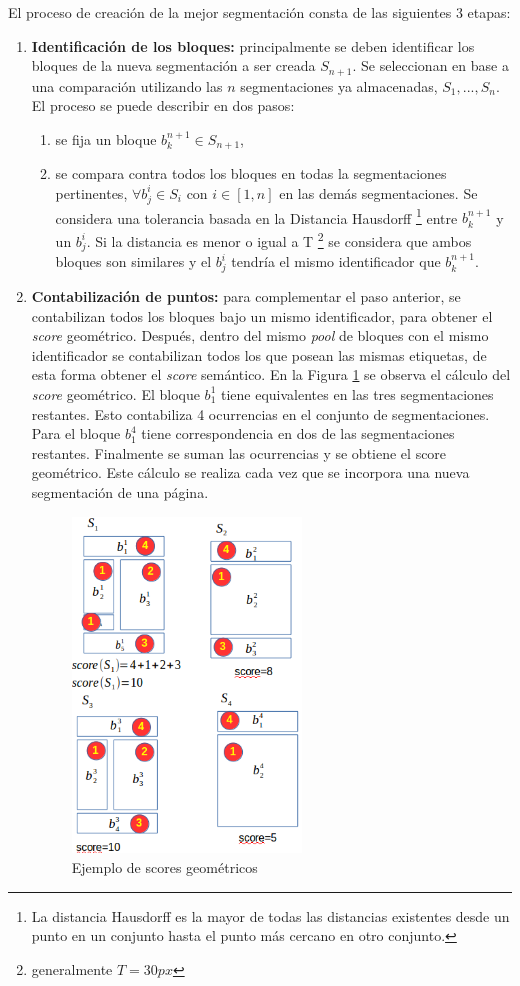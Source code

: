 \documentclass[10pt]{revecom}
\begin{document}
El proceso de creación de la mejor segmentación consta de las siguientes 3 etapas: 
\begin{enumerate}
\item \textbf{Identificación de los bloques:} principalmente se deben identificar los bloques de la nueva segmentación a ser creada $S_{n+1}$. Se seleccionan en base a una comparación utilizando las $n$ segmentaciones ya almacenadas, $S_{1},...,S_{n} $. 
El proceso se puede describir en dos pasos: 
\begin{enumerate}
\item se fija un bloque $b_{k}^{n+1} \in S_{n+1}$, 
\item se compara contra todos los bloques en todas la segmentaciones pertinentes, $\forall b_{j}^{i} \in S_i$ con $i \in [1,n]$ en las demás segmentaciones. 
Se considera una tolerancia basada en la Distancia Hausdorff \footnote{La distancia Hausdorff es la mayor de todas las distancias existentes desde un punto en un conjunto hasta el punto más cercano en otro conjunto.} entre $b_{k}^{n+1}$ y un $b_{j}^{i} $. 
Si la distancia es menor o igual a T \footnote{generalmente $T=30px$} se considera que ambos bloques son similares y el $b_{j}^{i}$  tendría el mismo identificador que $b_{k}^{n+1}$.  
 \end{enumerate}
\item \textbf{Contabilización de puntos:} para complementar el paso anterior, se contabilizan todos los bloques bajo un mismo identificador, para obtener el \textit{score} geométrico. Después, dentro del mismo \textit{pool} de bloques con el mismo identificador se contabilizan todos los que posean las mismas etiquetas, de esta forma obtener el \textit{score} semántico. 
En la Figura \ref{fig:geom} se observa el cálculo del \textit{score} geométrico. El bloque $b_{1}^{1}$ tiene equivalentes en las tres segmentaciones restantes. 
Esto contabiliza 4 ocurrencias en el conjunto de segmentaciones.
Para el bloque $b_{1}^{4}$ tiene correspondencia en dos de las segmentaciones restantes.
Finalmente se suman las ocurrencias y se obtiene el score geométrico.
Este cálculo se realiza cada vez que se incorpora una nueva segmentación de una página.

\begin{figure}[!h]
\centering
\includegraphics[width=230px]{mob-best.png}
\centering\caption{Ejemplo de scores geométricos}
\label{fig:geom}
\end{figure}


\end{enumerate}
\end{document}
